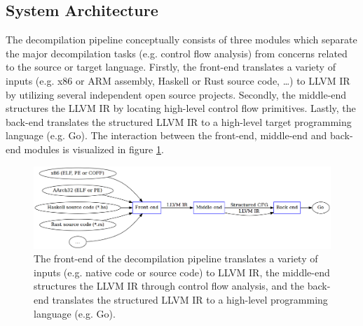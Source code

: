 


\subsection{System Architecture}

The decompilation pipeline conceptually consists of three modules which separate the major decompilation tasks (e.g. control flow analysis) from concerns related to the source or target language. Firstly, the front-end translates a variety of inputs (e.g. x86 or ARM assembly, Haskell or Rust source code, …) to LLVM IR by utilizing several independent open source projects. Secondly, the middle-end structures the LLVM IR by locating high-level control flow primitives. Lastly, the back-end translates the structured LLVM IR to a high-level target programming language (e.g. Go). The interaction between the front-end, middle-end and back-end modules is visualized in figure \ref{fig:decompilation_pipeline}.

\begin{figure}[htbp]
	\begin{center}
		\includegraphics[width=\textwidth]{inc/decompilation_pipeline.png}
		\caption{The front-end of the decompilation pipeline translates a variety of inputs (e.g. native code or source code) to LLVM IR, the middle-end structures the LLVM IR through control flow analysis, and the back-end translates the structured LLVM IR to a high-level programming language (e.g. Go).}
		\label{fig:decompilation_pipeline}
	\end{center}
\end{figure}

